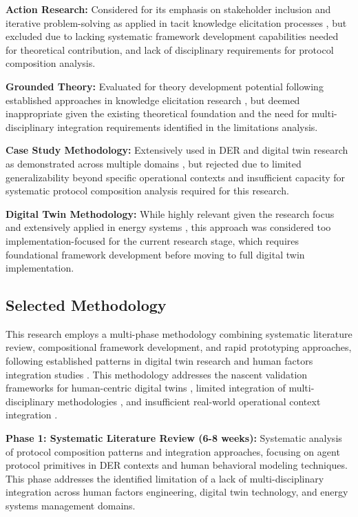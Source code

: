 \documentclass[12pt,a4paper]{article}
\begin{document}
\textbf{Action Research:} Considered for its emphasis on stakeholder inclusion and iterative problem-solving as applied in tacit knowledge elicitation processes \cite{10.1007/s44163-022-00020-w}, but excluded due to lacking systematic framework development capabilities needed for theoretical contribution, and lack of disciplinary requirements for protocol composition analysis.

\textbf{Grounded Theory:} Evaluated for theory development potential following established approaches in knowledge elicitation research \cite{10.1007/s44163-022-00020-w}, but deemed inappropriate given the existing theoretical foundation and the need for multi-disciplinary integration requirements identified in the limitations analysis.

\textbf{Case Study Methodology:} Extensively used in DER and digital twin research as demonstrated across multiple domains \cite{10.1016/j.apergo.2018.07.016} \cite{10.1109/ETFA61755.2024.10711109}, but rejected due to limited generalizability beyond specific operational contexts and insufficient capacity for systematic protocol composition analysis required for this research.

\textbf{Digital Twin Methodology:} While highly relevant given the research focus and extensively applied in energy systems \cite{10.1016/j.ifacol.2022.09.675} \cite{10.1186/s10033-024-00998-7}, this approach was considered too implementation-focused for the current research stage, which requires foundational framework development before moving to full digital twin implementation.

\subsection{Selected Methodology}

This research employs a multi-phase methodology combining systematic literature review, compositional framework development, and rapid prototyping approaches, following established patterns in digital twin research \cite{10.1016/j.esr.2024.101334} and human factors integration studies \cite{10.1109/ETFA61755.2024.10711109}. This methodology addresses the nascent validation frameworks for human-centric digital twins \cite{10.1109/etfa61755.2024.10711109}, limited integration of multi-disciplinary methodologies \cite{10.1016/j.ifacol.2022.09.675}, and insufficient real-world operational context integration \cite{10.1007/s10207-023-00784-x}.

\textbf{Phase 1: Systematic Literature Review (6-8 weeks):} Systematic analysis of protocol composition patterns and integration approaches, focusing on agent protocol primitives in DER contexts and human behavioral modeling techniques. This phase addresses the identified limitation of a lack of multi-disciplinary integration across human factors engineering, digital twin technology, and energy systems management domains.
\end{document}
